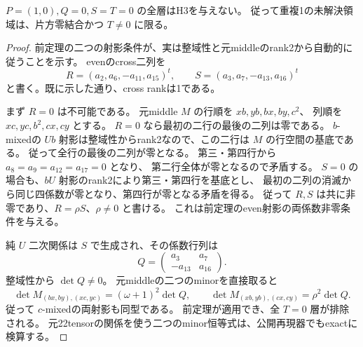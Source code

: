 \begin{corollary}
\label{cor:cubic-third-root-unit-onezero-Tzero-empty}
$P=(1,0),Q=0,S=T=0$ の全層はH3を与えない。
従って重複1の未解決領域は、片方零結合かつ $T\ne0$ に限る。
\end{corollary}
\begin{proof}
前定理の二つの射影条件が、実は整域性と元middleのrank2から自動的に従うことを示す。
evenのcross二列を
\[
 R=(a_2,a_6,-a_{11},a_{15})^t,\qquad
 S=(a_3,a_7,-a_{13},a_{16})^t
\]
と書く。既に示した通り、cross rankは1である。

まず $R=0$ は不可能である。
元middle $M$ の行順を $xb,yb,bx,by,c^2$、
列順を $xc,yc,b^2,cx,cy$ とする。
$R=0$ なら最初の二行の最後の二列は零である。
$b$-mixedの $Ub$ 射影は整域性からrank2なので、この二行は $M$ の行空間の基底である。
従って全行の最後の二列が零となる。
第三・第四行から $a_8=a_9=a_{12}=a_{17}=0$ となり、
第二行全体が零となるので矛盾する。
$S=0$ の場合も、$bU$ 射影のrank2により第三・第四行を基底とし、
最初の二列の消滅から同じ四係数が零となり、第四行が零となる矛盾を得る。
従って $R,S$ は共に非零であり、$R=\rho S$、$\rho\ne0$ と書ける。
これは前定理のeven射影の両係数非零条件を与える。

純 $U$ 二次関係は $S$ で生成され、その係数行列は
\[
 Q=\begin{pmatrix}a_3&a_7\\-a_{13}&a_{16}\end{pmatrix}.
\]
整域性から $\det Q\ne0$。
元middleの二つのminorを直接取ると
\[
 \det M_{(bx,by),(xc,yc)}=(\omega+1)^2\det Q,\qquad
 \det M_{(xb,yb),(cx,cy)}=\rho^2\det Q.
\]
従って $c$-mixedの両射影も同型である。
前定理が適用でき、全 $T=0$ 層が排除される。
元22tensorの関係を使う二つのminor恒等式は、公開再現器でもexactに検算する。
\end{proof}
